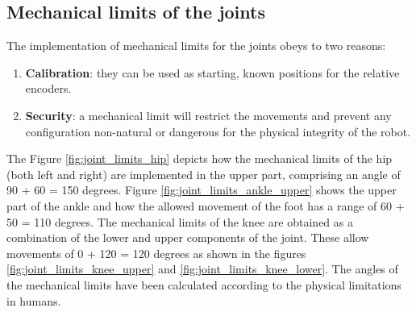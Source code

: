 \subsection{Mechanical limits of the joints} %
\label{sub:mechanical_limits}
The implementation of mechanical limits for the joints obeys to two reasons:
\begin{enumerate}
  \item \textbf{Calibration}: they can be used as starting, known positions for the relative encoders.
  \item \textbf{Security}: a mechanical limit will restrict the movements and prevent any configuration non-natural or dangerous for the physical integrity of the robot.
\end{enumerate}

The Figure \ref{fig:joint_limits_hip} depicts how the mechanical limits of the hip (both left and right) are implemented in the upper part, comprising an angle of 90 + 60 = 150 degrees.
Figure \ref{fig:joint_limits_ankle_upper} shows the upper part of the ankle and how the allowed movement of the foot has a range of 60 + 50 = 110 degrees.
The mechanical limits of the knee are obtained as a combination of the lower and upper components of the joint.
These allow movements of 0 + 120 = 120 degrees as shown in the figures \ref{fig:joint_limits_knee_upper} and \ref{fig:joint_limits_knee_lower}.
The angles of the mechanical limits have been calculated according to the physical limitations in humans.

